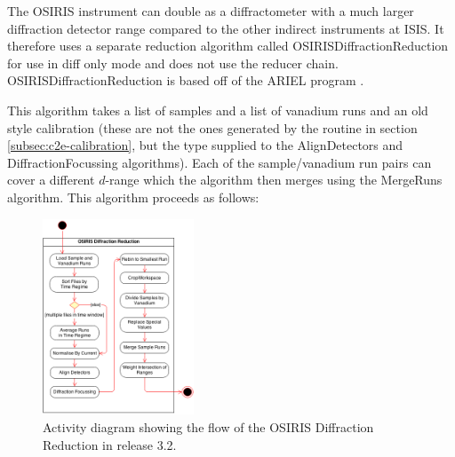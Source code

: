\documentclass[paper=a4, fontsize=11pt]{scrartcl}	%
\numberwithin{equation}{section}															%
\numberwithin{figure}{section}																%
\numberwithin{table}{section}																%
\begin{document}
The OSIRIS instrument can double as a diffractometer with a much larger diffraction detector range compared to the other indirect instruments at ISIS. It therefore uses a separate reduction algorithm called OSIRISDiffractionReduction for use in diff only mode and does not use the reducer chain. OSIRISDiffractionReduction is based off of the ARIEL program \cite{pradaelli2000ariel}. 

This algorithm takes a list of samples and a list of vanadium runs and an old style calibration (these are not the ones generated by the routine in section \ref{subsec:c2e-calibration}, but the type supplied to the AlignDetectors and DiffractionFocussing algorithms). Each of the sample/vanadium run pairs can cover a different $d$-range which the algorithm then merges using the MergeRuns algorithm. This algorithm proceeds as follows:

\begin{figure}[H]
\centering
\includegraphics[width=0.4\textwidth]{img/uml/activity_diagrams/OSIRISDiffractionReduction_activity.png}
\caption{Activity diagram showing the flow of the OSIRIS Diffraction Reduction in release 3.2.}
\label{fig:OSIRISdiffraction-class-diagram}
\end{figure}
\end{document}
